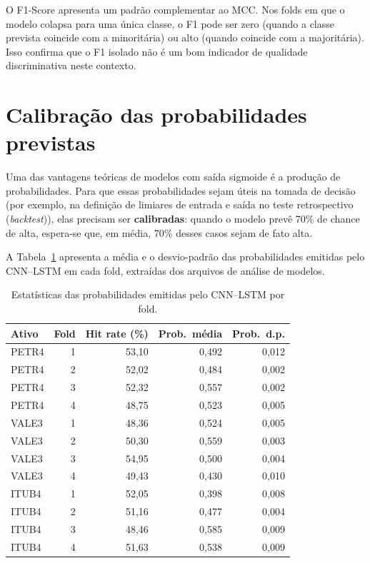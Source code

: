 O F1-Score apresenta um padrão complementar ao MCC. Nos folds em que o modelo colapsa
para uma única classe, o F1 pode ser zero (quando a classe prevista coincide com a minoritária)
ou alto (quando coincide com a majoritária). Isso confirma que o F1 isolado não é um bom
indicador de qualidade discriminativa neste contexto.

\section{Calibração das probabilidades previstas}
\label{sec:calibracao}

Uma das vantagens teóricas de modelos com saída sigmoide é a produção de probabilidades.
Para que essas probabilidades sejam úteis na tomada de decisão (por exemplo, na definição
de limiares de entrada e saída no teste retrospectivo (\textit{backtest})), elas precisam ser \textbf{calibradas}:
quando o modelo prevê 70\% de chance de alta, espera-se que, em média, 70\% desses casos
sejam de fato alta.

A Tabela~\ref{tab:calibracao-proba} apresenta a média e o desvio-padrão das probabilidades
emitidas pelo CNN--LSTM em cada fold, extraídas dos arquivos de análise de modelos.

\begin{table}[htbp]
  \centering
  \caption{Estatísticas das probabilidades emitidas pelo CNN--LSTM por fold.}
  \label{tab:calibracao-proba}
  \begin{tabular}{l r r r r}
    \toprule
    \textbf{Ativo} & \textbf{Fold} & \textbf{Hit rate (\%)} & \textbf{Prob.\ média} & \textbf{Prob.\ d.p.} \\
    \midrule
    PETR4 & 1 & 53,10 & 0,492 & 0,012 \\
    PETR4 & 2 & 52,02 & 0,484 & 0,002 \\
    PETR4 & 3 & 52,32 & 0,557 & 0,002 \\
    PETR4 & 4 & 48,75 & 0,523 & 0,005 \\
    \midrule
    VALE3 & 1 & 48,36 & 0,524 & 0,005 \\
    VALE3 & 2 & 50,30 & 0,559 & 0,003 \\
    VALE3 & 3 & 54,95 & 0,500 & 0,004 \\
    VALE3 & 4 & 49,43 & 0,430 & 0,010 \\
    \midrule
    ITUB4 & 1 & 52,05 & 0,398 & 0,008 \\
    ITUB4 & 2 & 51,16 & 0,477 & 0,004 \\
    ITUB4 & 3 & 48,46 & 0,585 & 0,009 \\
    ITUB4 & 4 & 51,63 & 0,538 & 0,009 \\
    \bottomrule
  \end{tabular}
\end{table}

